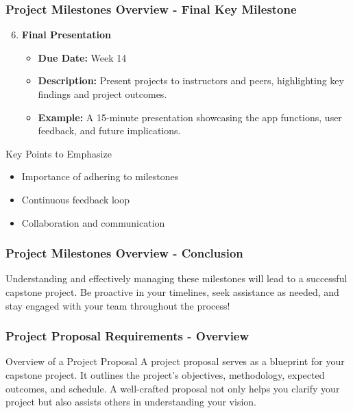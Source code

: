 \documentclass[aspectratio=169]{beamer}
\begin{document}
\begin{frame}[fragile]
  \frametitle{Project Milestones Overview - Final Key Milestone}
  \begin{enumerate}
    \setcounter{enumi}{5} %
    \item \textbf{Final Presentation}
      \begin{itemize}
        \item \textbf{Due Date:} Week 14
        \item \textbf{Description:} Present projects to instructors and peers, highlighting key findings and project outcomes.
        \item \textbf{Example:} A 15-minute presentation showcasing the app functions, user feedback, and future implications.
      \end{itemize}
  \end{enumerate}

  \begin{block}{Key Points to Emphasize}
    \begin{itemize}
      \item Importance of adhering to milestones
      \item Continuous feedback loop
      \item Collaboration and communication
    \end{itemize}
  \end{block}
\end{frame}

\begin{frame}[fragile]
  \frametitle{Project Milestones Overview - Conclusion}
  Understanding and effectively managing these milestones will lead to a successful capstone project. Be proactive in your timelines, seek assistance as needed, and stay engaged with your team throughout the process!
\end{frame}

\begin{frame}[fragile]
    \frametitle{Project Proposal Requirements - Overview}
    \begin{block}{Overview of a Project Proposal}
        A project proposal serves as a blueprint for your capstone project. It outlines the project's objectives, methodology, expected outcomes, and schedule. A well-crafted proposal not only helps you clarify your project but also assists others in understanding your vision.
    \end{block}
\end{frame}
\end{document}
